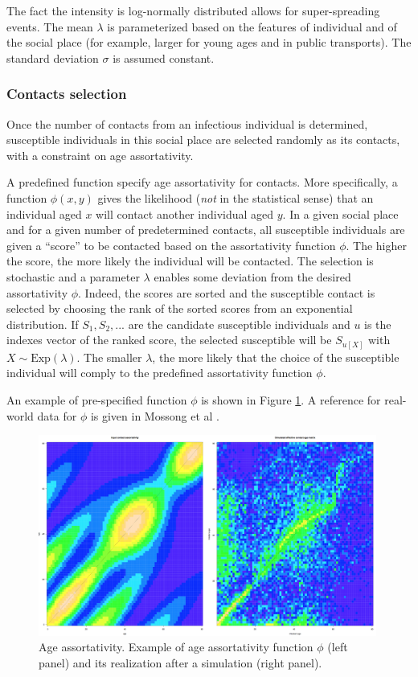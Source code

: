 \documentclass[11pt, onecolumn]{article}
\begin{document}
The fact the intensity is log-normally distributed allows for super-spreading events. The mean $\lambda$ is parameterized based on the features of individual and of the social place (for example, larger for young ages and in public transports). The standard deviation $\sigma$ is assumed constant.

\subsubsection*{Contacts selection}

Once the number of contacts from an infectious individual is determined, susceptible individuals in this social place are selected randomly as its contacts, with a constraint on age assortativity.

A predefined function specify age assortativity for contacts. More specifically, a function $\phi(x,y)$ gives the likelihood (\emph{not} in the statistical sense) that an individual aged $x$ will contact another individual aged $y$.
In a given social place and for a given number of predetermined contacts, all susceptible individuals are given a ``score'' to be contacted based on the assortativity function $\phi$. 
The higher the score, the more likely the individual will be contacted. The selection is stochastic and a parameter $\lambda$ enables some deviation from the desired assortativity $\phi$.
Indeed, the scores are sorted and the susceptible contact is selected by choosing the rank of the sorted scores from an exponential distribution. If $S_1, S_2, ...$ are the candidate susceptible individuals and $u$ is the indexes vector of the ranked score, the selected susceptible will be $S_{u[X]}$ with $ X \sim \text{Exp}(\lambda) $. The smaller $\lambda$, the more likely that the choice of the susceptible individual will comply to the predefined assortativity function $\phi$.

An example of pre-specified function $\phi$ is shown in Figure \ref{fig:age_assortativity}. A reference for real-world data for $\phi$ is given in Mossong et al \cite{Mossong:2008vz}.


\begin{figure}[!ht]
\centering
    \includegraphics[angle=0,width=0.99\textwidth]{figures/age_assort.png}
\caption{Age assortativity. Example of age assortativity function $\phi$ (left panel) and its realization after a simulation (right panel).}
\label{fig:age_assortativity}
\end{figure}
\end{document}
